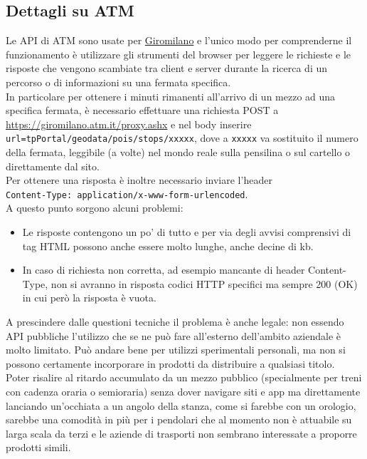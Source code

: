 \documentclass[12pt,a4paper]{report}
\begin{document}
\subsection{Dettagli su ATM}
Le API di ATM sono usate per \href{https://giromilano.atm.it}{Giromilano} e l'unico modo per comprenderne il funzionamento è utilizzare
gli strumenti del browser per leggere le richieste e le risposte che vengono scambiate tra client e server durante la ricerca di un
percorso o di informazioni su una fermata specifica.\\
In particolare per ottenere i minuti rimanenti all'arrivo di un mezzo ad una specifica fermata, è necessario effettuare una richiesta
POST a\\ \url{https://giromilano.atm.it/proxy.ashx} e nel body inserire\\ \texttt{url=tpPortal/geodata/pois/stops/xxxxx}, dove a
\texttt{xxxxx} va sostituito il numero della fermata, leggibile (a volte) nel mondo reale sulla pensilina o sul cartello o direttamente
dal sito.\\
Per ottenere una risposta è inoltre necessario inviare l'header\\ \texttt{Content-Type: application/x-www-form-urlencoded}.\\
A questo punto sorgono alcuni problemi:
\begin{itemize}
  \item Le risposte contengono un po' di tutto e per via degli avvisi comprensivi di tag HTML possono anche essere molto lunghe, anche
        decine di kb.
  \item In caso di richiesta non corretta, ad esempio mancante di header Content-Type, non si avranno in risposta codici HTTP specifici
        ma sempre 200 (OK) in cui però la risposta è vuota.
\end{itemize}

A prescindere dalle questioni tecniche il problema è anche legale: non essendo API pubbliche l'utilizzo che se ne può fare all'esterno
dell'ambito aziendale è molto limitato. Può andare bene per utilizzi sperimentali personali, ma non si possono certamente incorporare
in prodotti da distribuire a qualsiasi titolo.\\
Poter risalire al ritardo accumulato da un mezzo pubblico (specialmente per treni con cadenza oraria o semioraria) senza dover navigare
siti e app ma direttamente lanciando un'occhiata a un angolo della stanza, come si farebbe con un orologio, sarebbe una comodità in più
per i pendolari che al momento non è attuabile su larga scala da terzi e le aziende di trasporti non sembrano interessate a proporre
prodotti simili.





\end{document}
